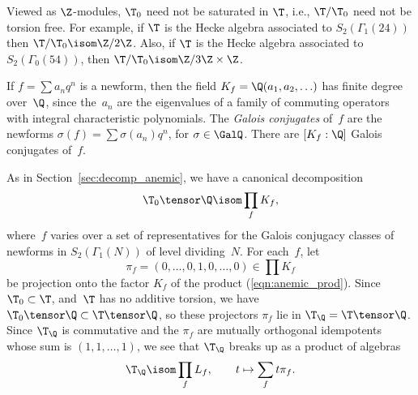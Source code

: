 \documentclass{report}
\begin{document}
\begin{remark}
Viewed as $\Z$-modules, $\T_0$ need not be saturated in $\T$,
i.e., $\T/\T_0$ need not be torsion free.  For example, if $\T$ is
the Hecke algebra associated to $S_2(\Gamma_1(24))$ then
$\T/\T_0\isom \Z/2\Z$.  Also, if $\T$ is the Hecke algebra
associated to $S_2(\Gamma_0(54))$, then $\T/\T_0\isom \Z/3\Z\times
\Z$. 

\end{remark}
If $f=\sum a_n q^n$ is a newform, then the field
$K_f=\Q(a_1,a_2,\ldots)$ has finite degree over~$\Q$, since
the~$a_n$ are the eigenvalues of a family of commuting operators
with integral characteristic polynomials. The {\em Galois
conjugates} of~$f$ are the newforms $\sigma(f) = \sum \sigma(a_n)
q^n$, for $\sigma\in\GalQ$. There are $[K_f:\Q]$ Galois conjugates
of~$f$.

As in Section~\ref{sec:decomp_anemic}, we have a canonical
decomposition
\begin{equation}\label{eqn:anemic_prod}
   \T_0\tensor\Q \isom \prod_f K_f,
\end{equation}
where~$f$ varies over a set of representatives for the Galois
conjugacy classes of newforms in $S_2(\Gamma_1(N))$ of level
dividing~$N$.  For each~$f$, let
$$\pi_f=(0,\ldots,0,1,0,\ldots,0)\in\prod K_f$$ be projection onto the
factor $K_f$ of the product (\ref{eqn:anemic_prod}). Since
$\T_0\subset\T$, and~$\T$ has no additive torsion, we have
$\T_0\tensor\Q \subset \T\tensor\Q$, so these projectors $\pi_f$
lie in $\T_\Q=\T\tensor\Q$. Since $\T_\Q$ is commutative and the
$\pi_f$ are mutually orthogonal idempotents whose sum is
$(1,1,\ldots,1)$, we see that $\T_\Q$ breaks up as a product of
algebras
\[
  \T_\Q \isom \prod_f L_f, \qquad{}t\mapsto\sum_f t\pi_f.
\]
\end{document}
